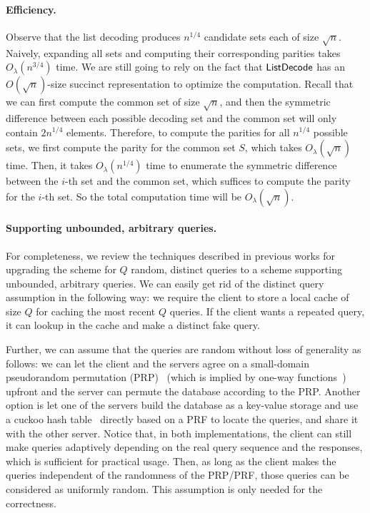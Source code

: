 \paragraph{Efficiency.}
Observe that the list decoding
produces $n^{1/4}$ candidate sets
each of size $\sqrt{n}$.
Naively, expanding all sets and computing their corresponding parities takes $O_\lambda(n^{3/4})$ time.
We are still going to rely on the fact that $\mathsf{ListDecode}$ has an $O(\sqrt{n})$-size succinct representation to optimize the computation. 
Recall that we can first compute the common set of size $\sqrt{n}$, and then the symmetric difference between each possible decoding set and the common set will only contain $2n^{1/4}$ elements. 
Therefore, to compute the parities for all $n^{1/4}$ possible sets, we first compute the parity for the common set $S$, which takes $O_\lambda(\sqrt{n})$ time.
Then, it takes $O_\lambda(n^{1/4})$ time to enumerate the symmetric difference between the $i$-th set and the common set, which suffices to compute the parity for the $i$-th set.
So the total computation time will be $O_\lambda(\sqrt{n})$.

\paragraph{Supporting unbounded, arbitrary queries.}
For completeness, we review the techniques described in previous works 
for upgrading the scheme for $Q$ random, distinct queries to a scheme
supporting unbounded, arbitrary queries.
We can easily get rid of the distinct query
assumption in the following way: we require the client to store a local cache of size $Q$ for caching the
most recent $Q$ queries. If the client wants a repeated query, it can lookup
in the cache and make a distinct fake query. 

Further, we can assume that the queries are random without loss of generality as follows: 
we can let the client and the servers agree on 
a small-domain pseudorandom permutation (PRP)~\cite{prp1,prp2} 
(which is implied by one-way functions~\cite{swapornot})
upfront and the server can permute the database according to the PRP. 
Another option is let one of the servers
build the database as a key-value storage and use a cuckoo hash
table~\cite{cuckoo1,cuckoo2} directly based on a PRF to locate the queries, and share it with the other server.
Notice that, in both implementations, the client can still make queries
adaptively depending on the real query sequence and the responses, which is
sufficient for practical usage. Then, as long as the client makes the
queries independent of the randomness of the PRP/PRF, those queries can be
considered as uniformly random. This assumption is only needed for the
correctness.

